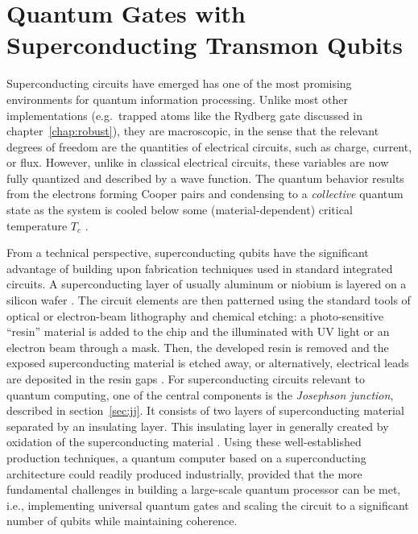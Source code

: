 \chapter{Quantum Gates with Superconducting Transmon Qubits}
\label{chap:transmon}

Superconducting circuits have emerged has one of the most promising
environments for quantum information processing. Unlike most other
implementations (e.g.\ trapped atoms like the Rydberg gate discussed in
chapter~\ref{chap:robust}), they are macroscopic, in the sense that the relevant
degrees of freedom are the quantities of electrical circuits, such as
charge, current, or flux. However, unlike in classical electrical circuits,
these variables are now fully quantized and described by a wave function. The
quantum behavior results from the electrons forming Cooper pairs and condensing
to a \emph{collective} quantum state as the system is cooled below some
(material-dependent) critical temperature $T_c$ \cite{TinkhamBook}.

From a technical perspective, superconducting qubits have the significant
advantage of building upon fabrication techniques used in standard integrated
circuits. A superconducting layer of usually aluminum or niobium is layered on
a silicon wafer
\cite{DevoretQIP2004, FrunzioITAS2005}.
The circuit elements are then patterned using the standard tools of optical or
electron-beam lithography and chemical etching: a photo-sensitive ``resin''
material is added to the chip and the illuminated with UV light or an electron
beam through a mask. Then, the developed resin is removed and the
exposed superconducting material is etched away, or alternatively, electrical
leads are deposited in the resin gaps \cite{HirstSCHandbook2003}.
For superconducting circuits relevant to quantum computing, one of the central
components is the \emph{Josephson junction}, described in
section~\ref{sec:jj}. It consists of two layers of superconducting material
separated by an insulating layer. This insulating layer in generally created by
oxidation of the superconducting material \cite{DevoretQIP2004,
FrunzioITAS2005}. Using these well-established production techniques,
a quantum computer based on a superconducting architecture could readily
produced industrially, provided that the more fundamental challenges in building
a large-scale quantum processor can be met, i.e., implementing universal quantum
gates and scaling the circuit to a significant number of qubits while
maintaining coherence.

